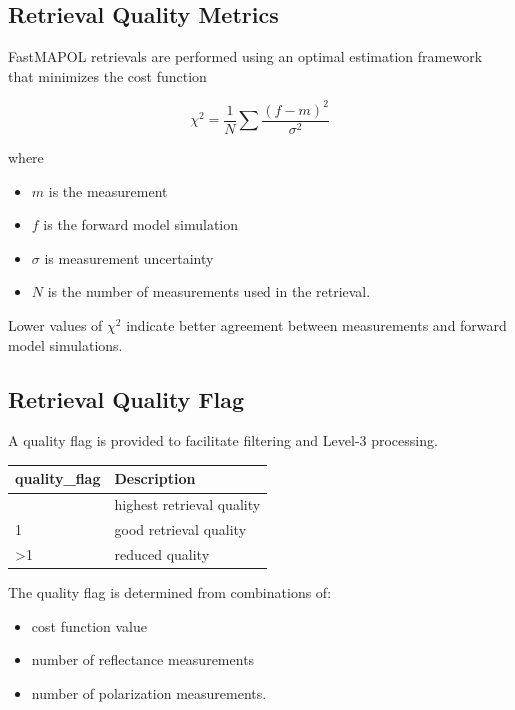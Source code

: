 \documentclass[
  letterpaper,
  open=any]{scrbook}
\providecommand{\tightlist}{%
  \setlength{\itemsep}{0pt}\setlength{\parskip}{0pt}}
\begin{document}
\subsection{Retrieval Quality Metrics}\label{retrieval-quality-metrics}

FastMAPOL retrievals are performed using an optimal estimation framework
that minimizes the cost function

\[
\chi^2 = \frac{1}{N}\sum \frac{(f-m)^2}{\sigma^2}
\]

where

\begin{itemize}
\tightlist
\item
  \(m\) is the measurement\\
\item
  \(f\) is the forward model simulation
\item
  \(\sigma\) is measurement uncertainty\\
\item
  \(N\) is the number of measurements used in the retrieval.
\end{itemize}

Lower values of \(\chi^2\) indicate better agreement between
measurements and forward model simulations.

\subsection{Retrieval Quality Flag}\label{retrieval-quality-flag}

A quality flag is provided to facilitate filtering and Level-3
processing.

\begin{longtable}[]{@{}ll@{}}
\toprule\noalign{}
quality\_flag & Description \\
\midrule\noalign{}
\endhead
\bottomrule\noalign{}
\endlastfoot
0 & highest retrieval quality \\
1 & good retrieval quality \\
\textgreater1 & reduced quality \\
\end{longtable}

The quality flag is determined from combinations of:

\begin{itemize}
\tightlist
\item
  cost function value
\item
  number of reflectance measurements
\item
  number of polarization measurements.
\end{itemize}
\end{document}

